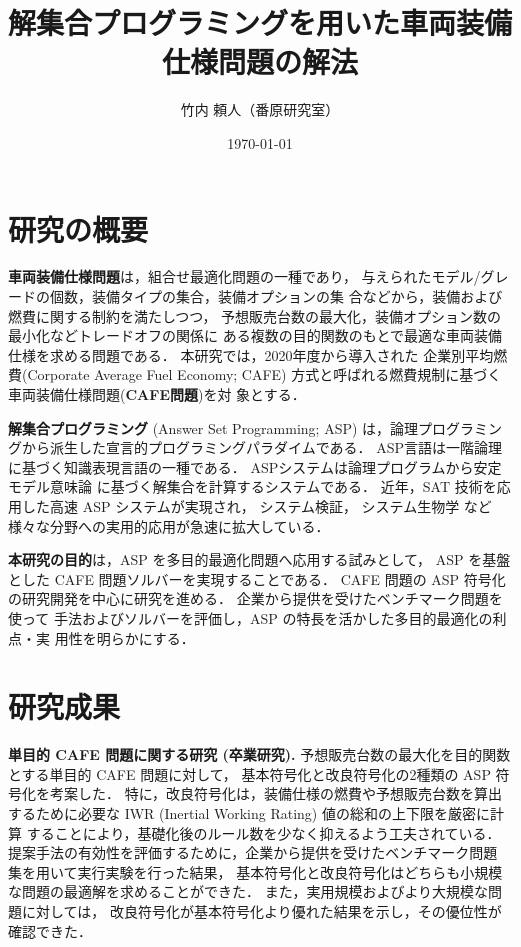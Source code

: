 \documentclass[a4j,10pt]{jarticle}
\title{解集合プログラミングを用いた車両装備仕様問題の解法}
\author{竹内 頼人（番原研究室）}
\date{\today}
\begin{document}
\maketitle
\thispagestyle{empty}
\begin{multicols}{1}

\section{研究の概要}
\textbf{車両装備仕様問題}は，組合せ最適化問題の一種であり，
与えられたモデル/グレードの個数，装備タイプの集合，装備オプションの集
合などから，装備および燃費に関する制約を満たしつつ，
予想販売台数の最大化，装備オプション数の最小化などトレードオフの関係に
ある複数の目的関数のもとで最適な車両装備仕様を求める問題である．
本研究では，2020年度から導入された
企業別平均燃費(Corporate Average Fuel Economy; CAFE)
方式と呼ばれる燃費規制に基づく車両装備仕様問題(\textbf{CAFE問題})を対
象とする．

\textbf{解集合プログラミング}
(Answer Set Programming; ASP)
は，論理プログラミングから派生した宣言的プログラミングパラダイムである．
ASP言語は一階論理に基づく知識表現言語の一種である．
ASPシステムは論理プログラムから安定モデル意味論
に基づく解集合を計算するシステムである．
近年，SAT 技術を応用した高速 ASP システムが実現され，
システム検証，
システム生物学
など様々な分野への実用的応用が急速に拡大している．

\textbf{本研究の目的}は，ASP を多目的最適化問題へ応用する試みとして，
ASP を基盤とした CAFE 問題ソルバーを実現することである．
CAFE 問題の ASP 符号化の研究開発を中心に研究を進める．
企業から提供を受けたベンチマーク問題を使って
手法およびソルバーを評価し，ASP の特長を活かした多目的最適化の利点・実
用性を明らかにする．

\section{研究成果}

\textbf{単目的 CAFE 問題に関する研究 (卒業研究). }
予想販売台数の最大化を目的関数とする単目的 CAFE 問題に対して，
基本符号化と改良符号化の2種類の ASP 符号化を考案した．
特に，改良符号化は，装備仕様の燃費や予想販売台数を算出するために必要な
IWR (Inertial Working Rating) 値の総和の上下限を厳密に計算
することにより，基礎化後のルール数を少なく抑えるよう工夫されている．
%
提案手法の有効性を評価するために，企業から提供を受けたベンチマーク問題
集を用いて実行実験を行った結果，
基本符号化と改良符号化はどちらも小規模な問題の最適解を求めることができた．
また，実用規模およびより大規模な問題に対しては，
改良符号化が基本符号化より優れた結果を示し，その優位性が確認できた．


\end{multicols}
\end{document}
